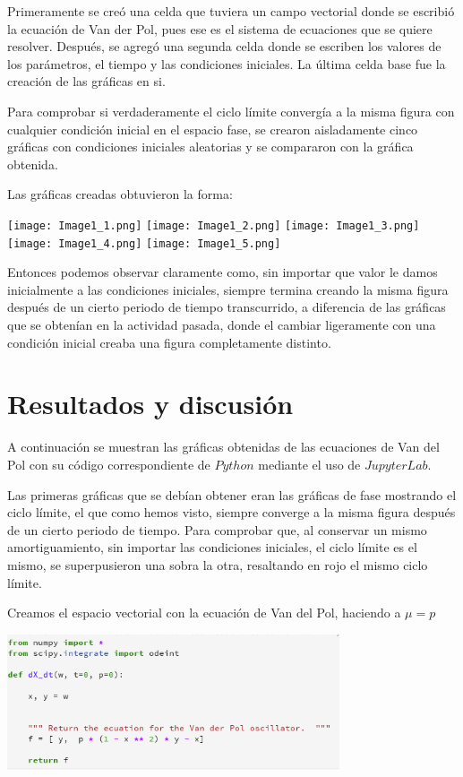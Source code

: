 \documentclass{article}
\begin{document}
Primeramente se creó una celda que tuviera un campo vectorial donde se escribió la ecuación de Van der Pol, pues ese es el sistema de ecuaciones que se quiere resolver. Después, se agregó una segunda celda donde se escriben los valores de los parámetros, el tiempo y las condiciones iniciales. La última celda base fue la creación de las gráficas en si.

Para comprobar si verdaderamente el ciclo límite convergía a la misma figura con cualquier condición inicial en el espacio fase, se crearon aisladamente cinco gráficas con condiciones iniciales aleatorias y se compararon con la gráfica obtenida. 

Las gráficas creadas obtuvieron la forma:
	\begin{center}
    \texttt{[image: Image1\_1.png]}
    \texttt{[image: Image1\_2.png]}
    \texttt{[image: Image1\_3.png]}
    \texttt{[image: Image1\_4.png]}
    \texttt{[image: Image1\_5.png]}
    \end{center}

Entonces podemos observar claramente como, sin importar que valor le damos inicialmente a  las condiciones iniciales, siempre termina creando la misma figura después de un cierto periodo de tiempo transcurrido, a diferencia de las gráficas que se obtenían en la actividad pasada, donde el cambiar ligeramente con una condición inicial creaba una figura completamente distinto.


\section{Resultados y discusión}
A continuación se muestran las gráficas obtenidas de las ecuaciones de Van del Pol con su código correspondiente de $Python$ mediante el uso de $Jupyter Lab$. 

Las primeras gráficas que se debían obtener eran las gráficas de fase mostrando el ciclo límite, el que como hemos visto, siempre converge a la misma figura después de un cierto periodo de tiempo.
Para comprobar que, al conservar un mismo amortiguamiento, sin importar las condiciones iniciales, el ciclo límite es el mismo, se superpusieron una sobra la otra, resaltando en rojo el mismo ciclo límite. 

Creamos el espacio vectorial con la ecuación de Van del Pol, haciendo a $ \mu = p$
	\begin{center}
    \includegraphics[height=4cm]{celda1.png}
    \end{center}
\end{document}
